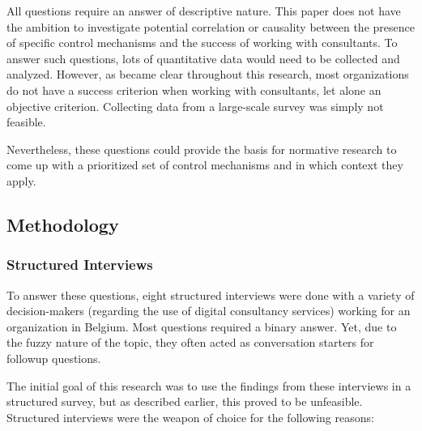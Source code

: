\documentclass[12pt]{article}
\begin{document}
All questions require an answer of descriptive nature. This paper does
not have the ambition to investigate potential correlation or causality
between the presence of specific control mechanisms and the success of
working with consultants. To answer such questions, lots of quantitative
data would need to be collected and analyzed. However, as became clear
throughout this research, most organizations do not have a success
criterion when working with consultants, let alone an objective
criterion. Collecting data from a large-scale survey was simply not
feasible.

Nevertheless, these questions could provide the basis for normative
research to come up with a prioritized set of control mechanisms and in
which context they apply.

\subsection{Methodology}\label{methodology}

\subsubsection{Structured Interviews}\label{structured-interviews}

To answer these questions, eight structured interviews were done with a
variety of decision-makers (regarding the use of digital consultancy
services) working for an organization in Belgium. Most questions
required a binary answer. Yet, due to the fuzzy nature of the topic,
they often acted as conversation starters for followup questions.

The initial goal of this research was to use the findings from these
interviews in a structured survey, but as described earlier, this proved
to be unfeasible. Structured interviews were the weapon of choice for
the following reasons:
\end{document}
